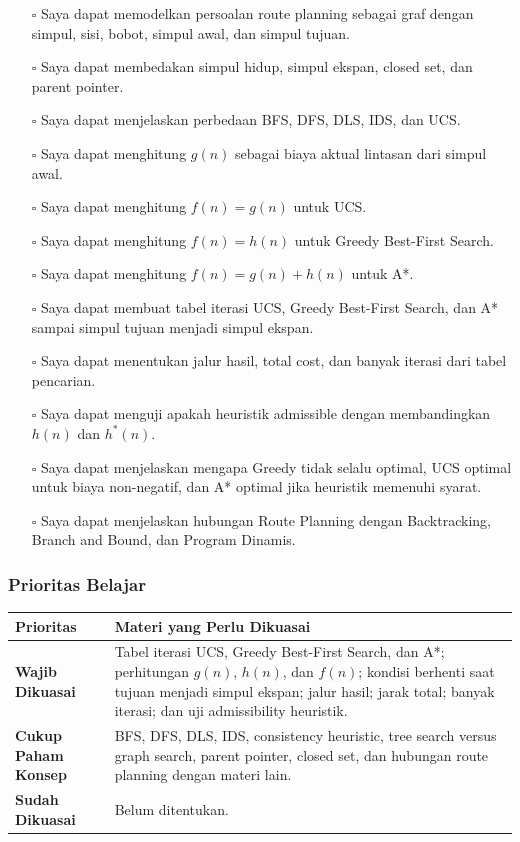 \begin{itemize}
    \item[$\square$] Saya dapat memodelkan persoalan route planning sebagai graf dengan simpul, sisi, bobot, simpul awal, dan simpul tujuan.
    \item[$\square$] Saya dapat membedakan simpul hidup, simpul ekspan, closed set, dan parent pointer.
    \item[$\square$] Saya dapat menjelaskan perbedaan BFS, DFS, DLS, IDS, dan UCS.
    \item[$\square$] Saya dapat menghitung $g(n)$ sebagai biaya aktual lintasan dari simpul awal.
    \item[$\square$] Saya dapat menghitung $f(n)=g(n)$ untuk UCS.
    \item[$\square$] Saya dapat menghitung $f(n)=h(n)$ untuk Greedy Best-First Search.
    \item[$\square$] Saya dapat menghitung $f(n)=g(n)+h(n)$ untuk A*.
    \item[$\square$] Saya dapat membuat tabel iterasi UCS, Greedy Best-First Search, dan A* sampai simpul tujuan menjadi simpul ekspan.
    \item[$\square$] Saya dapat menentukan jalur hasil, total cost, dan banyak iterasi dari tabel pencarian.
    \item[$\square$] Saya dapat menguji apakah heuristik admissible dengan membandingkan $h(n)$ dan $h^*(n)$.
    \item[$\square$] Saya dapat menjelaskan mengapa Greedy tidak selalu optimal, UCS optimal untuk biaya non-negatif, dan A* optimal jika heuristik memenuhi syarat.
    \item[$\square$] Saya dapat menjelaskan hubungan Route Planning dengan Backtracking, Branch and Bound, dan Program Dinamis.
\end{itemize}

\subsubsection{Prioritas Belajar}

\begin{tabularx}{\textwidth}{|L{0.22\textwidth}|X|}
\hline
\textbf{Prioritas} & \textbf{Materi yang Perlu Dikuasai} \\
\hline
\textbf{Wajib Dikuasai} & Tabel iterasi UCS, Greedy Best-First Search, dan A*; perhitungan $g(n)$, $h(n)$, dan $f(n)$; kondisi berhenti saat tujuan menjadi simpul ekspan; jalur hasil; jarak total; banyak iterasi; dan uji admissibility heuristik. \\
\hline
\textbf{Cukup Paham Konsep} & BFS, DFS, DLS, IDS, consistency heuristic, tree search versus graph search, parent pointer, closed set, dan hubungan route planning dengan materi lain. \\
\hline
\textbf{Sudah Dikuasai} & Belum ditentukan. \\
\hline
\end{tabularx}
